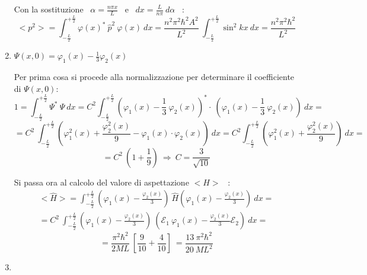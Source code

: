 \documentclass[12pt,twoside,a4]{article}
\begin{document}
\begin{solution}
\begin{enumerate}[label=(\textit{\roman*})]
Con la sostituzione \ $\alpha = \frac{n \pi x}{L}$ \ e \ $dx = \frac{L }{n \pi} \ d\alpha$ \ : 
\begin{equation*}
    < p^2 > = \int_{-\frac{L}{2}}^{+\frac{L}{2}} {\varphi(x)^\ast \ \hat{p}^2 \ \varphi(x)} \ dx = \frac{n^2 \pi^2 \hbar^2 A^2}{L^2} \ \int_{-\frac{L}{2}}^{+\frac{L}{2}} {\sin^2{kx}} \ dx = \frac{n^2 \pi^2 \hbar^2}{L^2}   
\end{equation*}

\item $\Psi(x,0) = \varphi_1(x) - \frac{1}{3} \varphi_2(x)$

Per prima cosa si procede alla normalizzazione per determinare il coefficiente di $\Psi(x,0)$: \begin{equation*}
1 = \int_{-\frac{L}{2}}^{+\frac{L}{2}} {\Psi^\ast \ \Psi} \ dx = C^2 \int_{-\frac{L}{2}}^{+\frac{L}{2}} {\left(\varphi_1(x)- \frac{1}{3}\ \varphi_2(x)\right)^\ast \cdot \ \left(\varphi_1(x)- \frac{1}{3} \ \varphi_2(x)\right)} \ dx  =     
\end{equation*}
\begin{equation*}
 = C^2 \ \int_{-\frac{L}{2}}^{+\frac{L}{2}} {\left( \varphi^2_1(x) +\frac{\varphi^2_2(x)}{9} - \varphi_1(x) \cdot \varphi_2(x) \right) } \ dx = C^2 \int_{-\frac{L}{2}}^{+\frac{L}{2}} {\left( \varphi^2_1(x) +\frac{\varphi^2_2(x)}{9} \right) } \ dx =    
\end{equation*}
\begin{equation*}
    = C^2 \ \left( 1 + \frac{1}{9}     \right)  \  \Rightarrow  \   C = \frac{3}{\sqrt{10}} 
\end{equation*}

\bigskip
Si passa ora al calcolo del valore di aspettazione $< \hat{H} > $ \ :
\begin{gather}
  < \hat{H} > = \int_{-\frac{L}{2}}^{+\frac{L}{2}} {\left(\varphi_1(x) - \frac{\varphi_2(x)}{3}\right) \ \hat{H} \left(\varphi_1(x) - \frac{\varphi_2(x)}{3}\right)} \ dx =\\= C^2 \ \int_{-\frac{L}{2}}^{+\frac{L}{2}} {\left(\varphi_1(x) - \frac{\varphi_2(x)}{3}\right) \ \left(\mathcal{E}_1 \ \varphi_1(x) - \frac{\varphi_2(x)}{3} \mathcal{E}_2\right)} \ dx =    
\end{gather}
\begin{equation*}
  = \frac{\pi^2 \hbar^2}{2 M L } \ \left[ \frac{9}{10} + \frac{4}{10}\right] \  = \frac{13 \ \pi^2 \hbar^2}{20 \ M L^2}   
\end{equation*}

\item 


\end{enumerate}
\end{solution}
\end{document}
